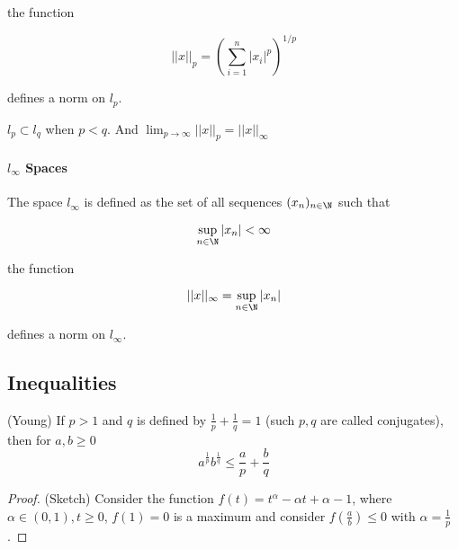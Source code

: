 the function  

\begin{equation*}
    ||x||_p = \left(\sum_{i=1}^n |x_i|^p\right)^{1/p}
\end{equation*}  

defines a norm on $l_p$.  
\begin{remark}
    $l_p \subset l_q$ when $p < q$. And $\lim_{p\to \infty} ||x||_p = ||x||_{\infty}$
\end{remark}
\paragraph*{$l_\infty$ Spaces}  
The space $l_\infty$ is defined as the set of all sequences $(x_n)_{n\in \N}$ such that

\begin{equation*}
    \sup_{n\in \N} |x_n| < \infty
\end{equation*}

the function

\begin{equation*}
    ||x||_\infty = \sup_{n\in \N} |x_n|
\end{equation*}

defines a norm on $l_\infty$.


\subsection{Inequalities}

\begin{prop}
\label{young}
(Young) If $p>1$ and $q$ is defined by $\frac{1}{p}+\frac{1}{q}=1$ (such $p,q$ are called conjugates), then for $a,b \geq 0$  
\begin{equation}
    a^{\frac{1}{p}}b^{\frac{1}{q}} \leq \frac{a}{p} + \frac{b}{q} 
\end{equation}
\end{prop}  

\begin{proof}
    (Sketch) Consider the function $f(t) = t^{\alpha}-\alpha t+\alpha-1$, where $\alpha \in (0,1), t\geq 0$,
    $f(1)=0$ is a maximum and consider $f(\frac{a}{b})\leq 0$ with $\alpha=\frac{1}{p}$.  
\end{proof}

